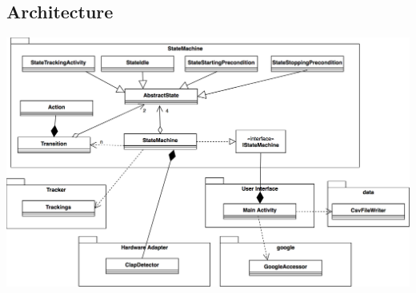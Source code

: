 \documentclass
[
 12pt, %
       DIV12,
       a4paper,
       oneside,
       titlepage,
       parskip=half,
       headings=normal,
       listof=totoc,
       bibliography=totoc,
       index=totoc,
       captions=tableheading,
       ]{scrreprt}
\begin{document}
\subsection{Architecture}
\label{sec:org393d659}

\begin{center}
\includegraphics[width=.9\linewidth]{./imgs/classUML.png}
\end{center}
\end{document}
